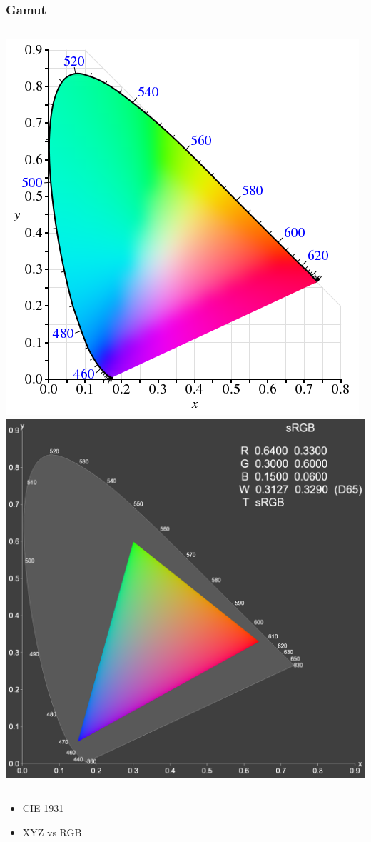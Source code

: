 \begin{frame}
    \frametitle{Gamut}
    \begin{columns}[c]
        \includegraphics[width=\textwidth]{pics/color/gamut}
        \includegraphics[width=\textwidth]{pics/color/Gamut-sRGB}
    \end{columns}
    \vfill
    \begin{itemize}
        \item CIE 1931
        \item XYZ vs RGB
    \end{itemize}
\end{frame}

